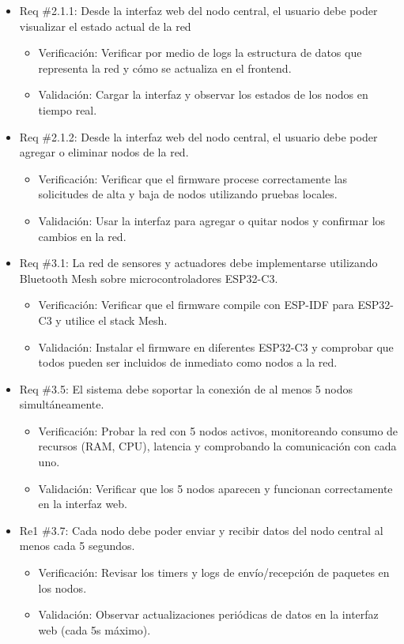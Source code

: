 \documentclass[
11pt, %
]{charter}
\begin{document}
\begin{itemize}
\item Req \#2.1.1: Desde la interfaz web del nodo central, el usuario debe poder visualizar el estado actual de la red
\begin{itemize}
	\item Verificación: Verificar por medio de logs la estructura de datos que representa la red y cómo se actualiza en el frontend.
	\item Validación: Cargar la interfaz y observar los estados de los nodos en tiempo real.
\end{itemize}


\item Req \#2.1.2: Desde la interfaz web del nodo central, el usuario debe poder agregar o eliminar nodos de la red.
\begin{itemize}
	\item Verificación: Verificar que el firmware procese correctamente las solicitudes de alta y baja de nodos utilizando pruebas locales.
	\item Validación: Usar la interfaz para agregar o quitar nodos y confirmar los cambios en la red.
\end{itemize}

\item Req \#3.1: La red de sensores y actuadores debe implementarse utilizando Bluetooth Mesh sobre microcontroladores ESP32-C3.
\begin{itemize}
	\item Verificación: Verificar que el firmware compile con ESP-IDF para ESP32-C3 y utilice el stack Mesh.
	\item Validación: Instalar el firmware en diferentes ESP32-C3 y comprobar que todos pueden ser incluidos de inmediato como nodos a la red. 
\end{itemize}


\item Req \#3.5: El sistema debe soportar la conexión de al menos 5 nodos simultáneamente.
\begin{itemize}
	\item Verificación: Probar la red con 5 nodos activos, monitoreando consumo de recursos (RAM, CPU), latencia y comprobando la comunicación con cada uno.
	\item Validación: Verificar que los 5 nodos aparecen y funcionan correctamente en la interfaz web.
\end{itemize}


\item Re1 \#3.7: Cada nodo debe poder enviar y recibir datos del nodo central al menos cada 5 segundos.
\begin{itemize}
	\item Verificación: Revisar los timers y logs de envío/recepción de paquetes en los nodos.
	\item Validación: Observar actualizaciones periódicas de datos en la interfaz web (cada 5s máximo).
\end{itemize}



\end{itemize}
\end{document}
